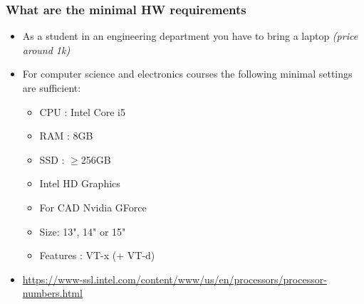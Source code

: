 \begin{frame} \frametitle{What are the minimal HW requirements}
  \begin{itemize}\setlength{\itemsep}{10pt}
  \item<1-> As a student in an engineering department you have to bring a laptop \textit{(price around 1k)}
  \item<2-> For computer science and electronics courses the following minimal settings are sufficient:
    \begin{multicols}{2}
      \begin{itemize}\setlength{\itemsep}{5pt}
        \item CPU : Intel Core i5
        \item RAM : 8GB
        \item SSD : $\geq$256GB 
        \item Intel HD Graphics
        \item For CAD Nvidia GForce 
        \item Size: 13", 14" or 15"
        \item Features : VT-x (+ VT-d)
      \end{itemize}
    \end{multicols}
    \item<3-> \url{https://www-ssl.intel.com/content/www/us/en/processors/processor-numbers.html}
  \end{itemize}
\end{frame}
